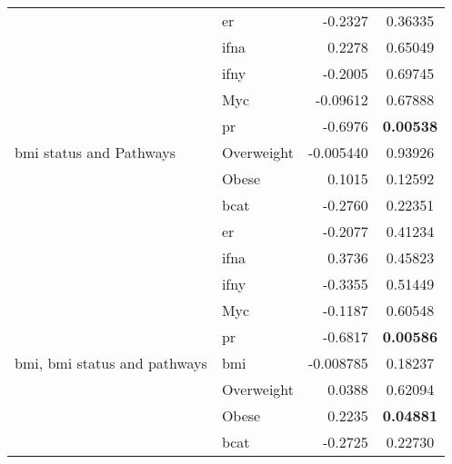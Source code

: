 \begin{table}[htpb]
\begin{threeparttable}
\begin{tabular}{llrc}
                                                                           & \gls{er}   & -0.2327   & 0.36335 \\
                                                                           & \gls{ifna} & 0.2278    & 0.65049 \\
                                                                           & \gls{ifny} & -0.2005   & 0.69745 \\
                                                                           & Myc        & -0.09612  & 0.67888 \\
                                                                           & \gls{pr}   & -0.6976   & \bfseries 0.00538  \\
				\hline
				\rule{0pt}{2.25ex}\gls{bmi} status and Pathways            & Overweight & -0.005440 & 0.93926 \\
                                                                           & Obese      & 0.1015    & 0.12592 \\
                                                                           & \gls{bcat} & -0.2760   & 0.22351 \\
                                                                           & \gls{er}   & -0.2077   & 0.41234 \\
                                                                           & \gls{ifna} & 0.3736    & 0.45823 \\
                                                                           & \gls{ifny} & -0.3355   & 0.51449 \\
                                                                           & Myc        & -0.1187   & 0.60548 \\
                                                                           & \gls{pr}   & -0.6817   & \bfseries 0.00586  \\
				\hline
				\rule{0pt}{2.25ex}\gls{bmi}, \gls{bmi} status and pathways & \gls{bmi}  & -0.008785 & 0.18237 \\
                                                                           & Overweight & 0.0388    & 0.62094 \\
                                                                           & Obese      & 0.2235    & \bfseries 0.04881  \\
                                                                           & \gls{bcat} & -0.2725   & 0.22730 \\

\end{tabular}
\end{threeparttable}
\end{table}
